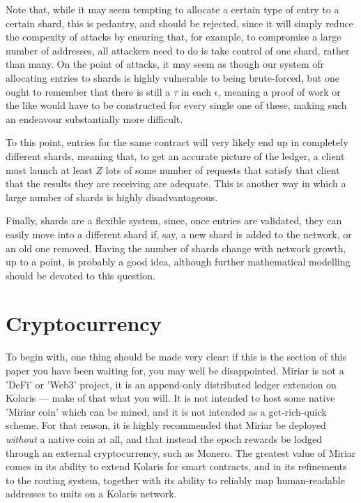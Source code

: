 \documentclass{extreport}
\begin{document}
Note that, while it may seem tempting to allocate a certain type of entry to a certain shard, this is pedantry, and should be rejected, since it will simply reduce the compexity of attacks by ensuring that, for example, to compromise a large number of addresses, all attackers need to do is take control of one shard, rather than many. On the point of attacks, it may seem as though our system ofr allocating entries to shards is highly vulnerable to being brute-forced, but one ought to remember that there is still a \(\tau\) in each \(\epsilon\), meaning a proof of work or the like would have to be constructed for every single one of these, making such an endeavour substantially more difficult.

To this point, entries for the same contract will very likely end up in completely different shards, meaning that, to get an accurate picture of the ledger, a client must launch at least \(Z\) lots of some number of requests that satisfy that client that the results they are receiving are adequate. This is another way in which a large number of shards is highly disadvantageous.

Finally, shards are a flexible system, since, once entries are validated, they can easily move into a different shard if, say, a new shard is added to the network, or an old one removed. Having the number of shards change with network growth, up to a point, is probably a good idea, although further mathematical modelling should be devoted to this question.

\chapter{Cryptocurrency}
\label{sec:org7b7ddbf}

To begin with, one thing should be made very clear: if this is the section of this paper you have been waiting for, you may well be disappointed. Miriar is not a 'DeFi' or 'Web3' project, it is an append-only distributed ledger extension on Kolaris --- make of that what you will. It is not intended to host some native 'Miriar coin' which can be mined, and it is not intended as a get-rich-quick scheme. For that reason, it is highly recommended that Miriar be deployed \emph{without} a native coin at all, and that instead the epoch rewards be lodged through an external cryptocurrency, such as Monero. The greatest value of Miriar comes in its ability to extend Kolaris for smart contracts, and in its refinements to the routing system, together with its ability to reliably map human-readable addresses to units on a Kolaris network.
\end{document}
